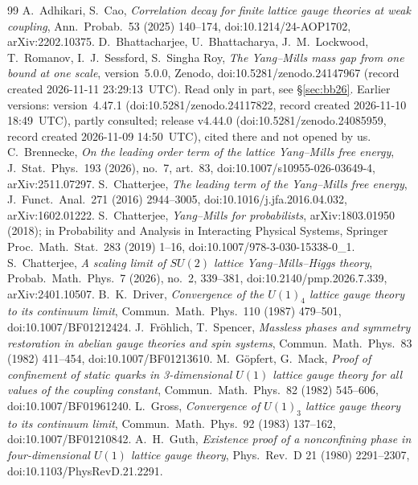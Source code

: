 \documentclass[11pt,a4paper]{article}
\theoremstyle{plain}
\theoremstyle{definition}
\theoremstyle{remark}
\numberwithin{equation}{section}
\begin{document}
{\small
\begin{thebibliography}{99}\setlength{\itemsep}{1pt}
 A.~Adhikari, S.~Cao, \emph{Correlation decay for finite lattice gauge theories at weak coupling}, Ann.\ Probab.\ 53
(2025) 140--174, doi:10.1214/24-AOP1702, arXiv:2202.10375.
 D.~Bhattacharjee, U.~Bhattacharya, J.~M.~Lockwood, T.~Romanov, I.~J.~Sessford, S.~Singha Roy, \emph{The Yang--Mills mass gap from one bound
at one scale}, version~5.0.0, Zenodo, doi:10.5281/zenodo.24147967 (record created 2026-11-11 23:29:13~UTC). Read only in part, see \S\ref{sec:bb26}. Earlier versions:
version~4.47.1 (doi:10.5281/zenodo.24117822, record created 2026-11-10 18:49~UTC), partly consulted; release v4.44.0 (doi:10.5281/zenodo.24085959, record created
2026-11-09 14:50~UTC), cited there and not opened by us.
 C.~Brennecke, \emph{On the leading order term of the lattice Yang--Mills free energy}, J.\ Stat.\ Phys.\ 193 (2026),
no.~7, art.~83, doi:10.1007/s10955-026-03649-4, arXiv:2511.07297.
 S.~Chatterjee, \emph{The leading term of the Yang--Mills free energy}, J.\ Funct.\ Anal.\ 271 (2016) 2944--3005,
doi:10.1016/j.jfa.2016.04.032, arXiv:1602.01222.
 S.~Chatterjee, \emph{Yang--Mills for probabilists}, arXiv:1803.01950 (2018); in Probability and Analysis in Interacting
Physical Systems, Springer Proc.\ Math.\ Stat.\ 283 (2019) 1--16, doi:10.1007/978-3-030-15338-0\_1.
 S.~Chatterjee, \emph{A scaling limit of $SU(2)$ lattice Yang--Mills--Higgs theory}, Probab.\ Math.\ Phys.\ 7 (2026),
no.~2, 339--381, doi:10.2140/pmp.2026.7.339, arXiv:2401.10507.
 B.~K.~Driver, \emph{Convergence of the $U(1)_4$ lattice gauge theory to its continuum limit}, Commun.\ Math.\ Phys.\ 110
(1987) 479--501, doi:10.1007/BF01212424.
 J.~Fr\"ohlich, T.~Spencer, \emph{Massless phases and symmetry restoration in abelian gauge theories and spin systems},
Commun.\ Math.\ Phys.\ 83 (1982) 411--454, doi:10.1007/BF01213610.
 M.~G\"opfert, G.~Mack, \emph{Proof of confinement of static quarks in 3-dimensional $U(1)$ lattice gauge theory for all
values of the coupling constant}, Commun.\ Math.\ Phys.\ 82 (1982) 545--606, doi:10.1007/BF01961240.
 L.~Gross, \emph{Convergence of $U(1)_3$ lattice gauge theory to its continuum limit}, Commun.\ Math.\ Phys.\ 92 (1983)
137--162, doi:10.1007/BF01210842.
 A.~H.~Guth, \emph{Existence proof of a nonconfining phase in four-dimensional $U(1)$ lattice gauge theory}, Phys.\ Rev.\
D 21 (1980) 2291--2307, doi:10.1103/PhysRevD.21.2291.

\end{thebibliography}}
\end{document}
